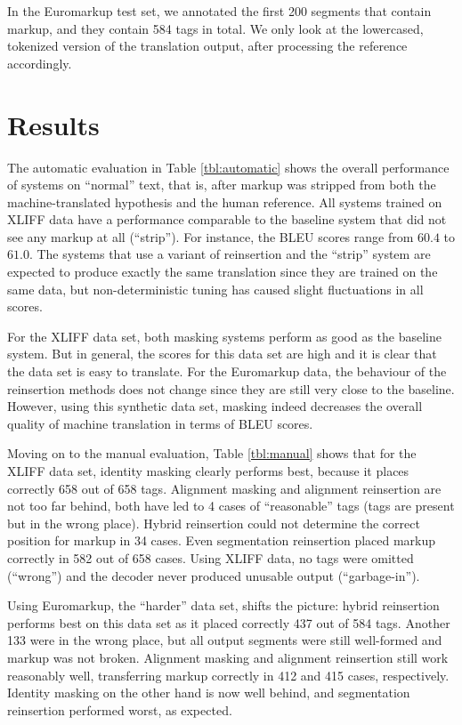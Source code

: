 \documentclass[11pt,letterpaper]{article}
\begin{document}
In the Euromarkup test set, we annotated the first 200 segments that contain markup, and they contain 584 tags in total. We only look at the lowercased, tokenized version of the translation output, after processing the reference accordingly.


\section{Results}

The automatic evaluation in Table \ref{tbl:automatic} shows the overall performance of systems on ``normal'' text, that is, after markup was stripped from both the machine-translated hypothesis and the human reference. All systems trained on XLIFF data have a performance comparable to the baseline system that did not see any markup at all (``strip''). For instance, the BLEU scores range from $60.4$ to $61.0$. The systems that use a variant of reinsertion and the ``strip'' system are expected to produce exactly the same translation since they are trained on the same data, but non-deterministic tuning has caused slight fluctuations in all scores. 

For the XLIFF data set, both masking systems perform as good as the baseline system. But in general, the scores for this data set are high and it is clear that the data set is easy to translate. For the Euromarkup data, the behaviour of the reinsertion methods does not change since they are still very close to the baseline. However, using this synthetic data set, masking indeed decreases the overall quality of machine translation in terms of BLEU scores.

Moving on to the manual evaluation, Table \ref{tbl:manual} shows that for the XLIFF data set, identity masking clearly performs best, because it places correctly 658 out of 658 tags. Alignment masking and alignment reinsertion are not too far behind, both have led to 4 cases of ``reasonable'' tags (tags are present but in the wrong place). Hybrid reinsertion could not determine the correct position for markup in 34 cases. Even segmentation reinsertion placed markup correctly in 582 out of 658 cases. Using XLIFF data, no tags were omitted (``wrong'') and the decoder never produced unusable output (``garbage-in'').

Using Euromarkup, the ``harder'' data set, shifts the picture: hybrid reinsertion performs best on this data set as it placed correctly 437 out of 584 tags. Another 133 were in the wrong place, but all output segments were still well-formed and markup was not broken. Alignment masking and alignment reinsertion still work reasonably well, transferring markup correctly in 412 and 415 cases, respectively. Identity masking on the other hand is now well behind, and segmentation reinsertion performed worst, as expected.
\end{document}
